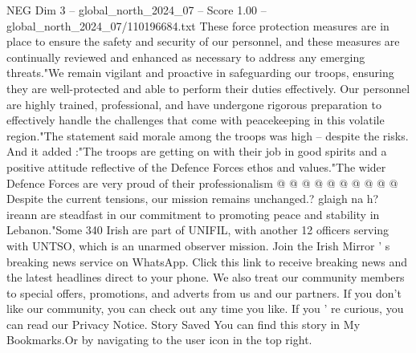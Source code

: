 \begin{textsample}{NEG Dim 3 – global\_north\_2024\_07 – Score 1.00 – global\_north\_2024\_07/110196684.txt}
These force protection measures are in place to ensure the safety and security of our personnel, and these measures are continually reviewed and enhanced as necessary to address any emerging threats."We remain vigilant and proactive in safeguarding our troops, ensuring they are well-protected and able to perform their duties effectively.
Our personnel are highly trained, professional, and have undergone rigorous preparation to effectively handle the challenges that come with peacekeeping in this volatile region."The statement said morale among the troops was high -- despite the risks.
And it added :"The troops are getting on with their job in good spirits and a positive attitude reflective of the Defence Forces ethos and values."The wider Defence Forces are very proud of their professionalism @ @ @ @ @ @ @ @ @ @ Despite the current tensions, our mission remains unchanged.? glaigh na h? ireann are steadfast in our commitment to promoting peace and stability in Lebanon."Some 340 Irish are part of UNIFIL, with another 12 officers serving with UNTSO, which is an unarmed observer mission.
Join the Irish Mirror ' s breaking news service on WhatsApp.
Click this link to receive breaking news and the latest headlines direct to your phone.
We also treat our community members to special offers, promotions, and adverts from us and our partners.
If you don't like our community, you can check out any time you like.
If you ' re curious, you can read our Privacy Notice.
Story Saved You can find this story in My Bookmarks.Or by navigating to the user icon in the top right.

\end{textsample}
